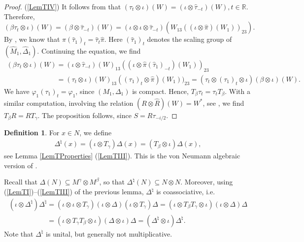 \documentclass[11pt]{article}
\numberwithin{equation}{section}
\theoremstyle{definition}
\newtheorem{dfn}[thm]{Definition}
\begin{document}
\begin{proof}
(\ref{LemTIV})
It follows from \cite[Proposition 2.1, Corollary 2.2]{KusVaeII} that $(\tau_t \otimes \iota)(W) = (\iota \otimes \hat{\tau}_{-t})(W), t \in \mathbb{R}$. Therefore,
\[
(\beta \tau_t \otimes \iota)(W) = (\beta \otimes \hat{\tau}_{-t})(W) = (\iota \otimes \iota \otimes \hat{\tau}_{-t})(W_{13}((\iota \otimes \hat{\pi})(W_1))_{23}).
\]
By \cite[Proposition 5.45]{KusVae}, we know that $\hat{\pi}(\hat{\tau}_1)_t = \hat{\tau}_t \hat{\pi}$. Here $(\hat{\tau}_1)_t$ denotes the scaling group of $(\hat{M}_1, \hat{\Delta}_1)$. Continuing the equation, we f\/ind
\begin{gather*}
  (\beta \tau_t \otimes \iota)(W)  = (\iota \otimes \hat{\tau}_{-t})(W)_{13} ((\iota \otimes   \hat{\pi}(\hat{\tau}_1)_{-t})(W_1))_{23} \\
\phantom{(\beta \tau_t \otimes \iota)(W)}{}
=  (\tau_t \otimes \iota)(W)_{13} ((\tau_1)_{t}\otimes \hat{\pi})(W_1))_{23} =
(\tau_t \otimes (\tau_1)_{t} \otimes \iota) (\beta \otimes \iota)(W).
\end{gather*}
We have $\varphi_1 (\tau_1)_t =  \varphi_1$, since $(M_1, \Delta_1)$ is compact. Hence, $T_\beta \tau_t = \tau_t T_\beta$. With a similar computation, involving the relation $(R \otimes \hat{R})(W) = W^\ast$, see \cite[Proposition 2.1, Corollary 2.2]{KusVaeII}, we f\/ind $T_\beta R = R T_\gamma$. The proposition follows, since $S = R \tau_{-i/2}$.
\end{proof}

\begin{dfn}
For $x \in N$, we def\/ine
\begin{gather}\label{EqnShiftedCom}
\Delta^\natural(x) = (\iota \otimes T_\gamma) \Delta(x) = (T_\beta \otimes \iota) \Delta(x),
\end{gather}
 see Lemma \ref{LemTProperties} (\ref{LemTIII}). This is the von Neumann algebraic version of \cite[equation~(4)]{VaiHyp}.
\end{dfn}
  Recall that $\Delta(N) \subseteq M^\gamma \otimes M^\beta$, so that $\Delta^\natural(N) \subseteq N \otimes N$. Moreover, using (\ref{LemTI})--(\ref{LemTIII}) of the previous lemma, $\Delta^\natural$ is coassociative, i.e.
\begin{gather}
   (\iota \otimes \Delta^\natural) \Delta^\natural  = (\iota \otimes \iota \otimes T_\gamma)(\iota \otimes \Delta)(\iota \otimes T_\gamma)\Delta
 = (\iota \otimes T_\beta   T_\gamma \otimes \iota) (\iota \otimes \Delta) \Delta \nonumber\\
\phantom{(\iota \otimes \Delta^\natural) \Delta^\natural }{}
=   (\iota \otimes T_\gamma   T_\beta \otimes \iota) (\Delta \otimes \iota) \Delta
 =  ( \Delta^\natural \otimes \iota) \Delta^\natural.\label{EqnCoas}
\end{gather}
Note that $\Delta^\natural$ is unital, but generally not multiplicative.
\end{document}
